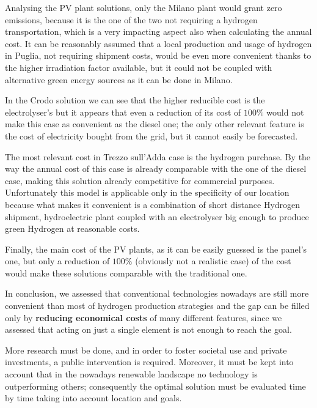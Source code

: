 Analysing the PV plant solutions, only the Milano plant would grant zero emissions, because it is the one of the two not requiring a hydrogen transportation, which is a very impacting aspect also when calculating the annual cost. It can be reasonably assumed that a local production and usage of hydrogen in Puglia, not requiring shipment costs, would be even more convenient thanks to the higher irradiation factor available, but it could not be coupled with alternative green energy sources as it can be done in Milano.

In the Crodo solution we can see that the higher reducible cost is the electrolyser’s but it appears that even a reduction of its cost of $100\%$ would not make this case as convenient as the diesel one; the only other relevant feature is the cost of electricity bought from the grid, but it cannot easily be forecasted.

The most relevant cost in Trezzo sull'Adda case is the hydrogen purchase. By the way the annual cost of this case is already comparable with the one of the diesel case, making this solution already competitive for commercial purposes. Unfortunately this model is applicable only in the specificity of our location because what makes it convenient is a combination of short distance Hydrogen shipment, hydroelectric plant coupled with an electrolyser big enough to produce green Hydrogen at reasonable costs.

Finally, the main cost of the PV plants, as it can be easily guessed is the panel’s one, but only a reduction of $100\%$ (obviously not a realistic case) of the cost would make these solutions comparable with the traditional one.

In conclusion, we assessed that conventional technologies nowadays are still more convenient than most of hydrogen production strategies and the gap can be filled only by\textbf{ reducing economical costs} of many different features, since we assessed that acting on just a single element is not enough to reach the goal.

More research must be done, and in order to foster societal use and private investments, a public intervention is required. Moreover, it must be kept into account that in the nowadays renewable landscape no technology is outperforming others; consequently the optimal solution must be evaluated time by time taking into account location and goals.